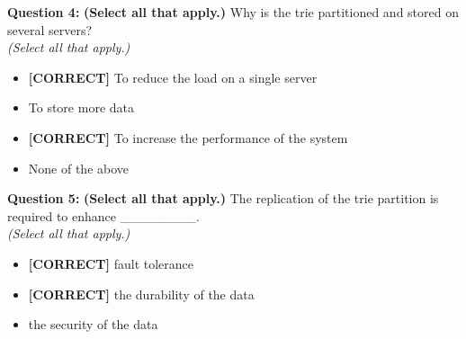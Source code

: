 \vspace{0.3cm}
\noindent
\textbf{Question 4:} \textbf{(Select all that apply.)} Why is the trie partitioned and stored on several servers?
\\
\textit{(Select all that apply.)}
\\[0.2cm]
\begin{itemize}
 \item \textbf{[CORRECT]} To reduce the load on a single server
 \item To store more data
 \item \textbf{[CORRECT]} To increase the performance of the system
 \item None of the above
\end{itemize}
\vspace{0.3cm}
\noindent
\textbf{Question 5:} \textbf{(Select all that apply.)} The replication of the trie partition is required to enhance \_\_\_\_\_\_\_\_.
\\
\textit{(Select all that apply.)}
\\[0.2cm]
\begin{itemize}
 \item \textbf{[CORRECT]} fault tolerance
 \item \textbf{[CORRECT]} the durability of the data
 \item the security of the data
\end{itemize}

